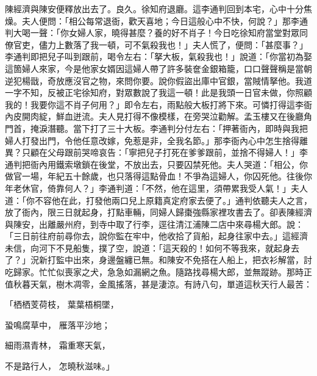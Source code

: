\begin{showcontents}{}
陳經濟與陳安便釋放出去了。良久。徐知府退廳。這李通判回到本宅，心中十分焦燥。夫人便問：「相公每常退衙，歡天喜地；今日這般心中不快，何說？」那李通判大喝一聲：「你女婦人家，曉得甚麼？養的好不肖子！今日吃徐知府當堂對眾同僚官吏，儘力上數落了我一頓，可不氣殺我也！」夫人慌了，便問：「甚麼事？」李通判即把兒子叫到跟前，喝令左右：「拏大板，氣殺我也！」說道：「你當初為娶這箇婦人來家，今是他家女婿因這婦人帶了許多裝奩金銀箱籠，口口聲聲稱是當朝逆犯楊戩，奇放應沒官之物，來問你要。說你假盜出庫中官銀，當賊情拏他。我道一字不知，反被正宅徐知府，對眾數說了我這一頓！此是我頭一日官未做，你照顧我的！我要你這不肖子何用？」即令左右，雨點般大板打將下來。可憐打得這李衙內皮開肉綻，鮮血迸流。夫人見打得不像模樣，在旁哭泣勸解。孟玉樓又在後廳角門首，掩淚潛聽。當下打了三十大板。李通判分付左右：「押著衙內，即時與我把婦人打發出門，令他任意改嫁，免惹是非，全我名節。」那李衙內心中怎生捨得離異？只顧在父母跟前哭啼哀告：「寧把兒子打死在爹爹跟前，並捨不得婦人！」李通判把衙內用鐵索墩鎖在後堂，不放出去，只要囚禁死他。夫人哭道：「相公，你做官一場，年紀五十餘歲，也只落得這點骨血！不爭為這婦人，你囚死他。往後你年老休官，倚靠何人？」李通判道：「不然，他在這里，須帶累我受人氣！」夫人道：「你不容他在此，打發他兩口兒上原籍真定府家去便了。」通判依聽夫人之言，放了衙內，限三日就起身，打點車輛，同婦人歸棗強縣家裡攻書去了。卻表陳經濟與陳安，出離嚴州府，到寺中取了行李，逕往清江浦陳二店中來尋楊大郎。說：「三日前往府前尋你去，說你監在牢中，他收拾了貨船，起身往家中去。」這經濟未信，向河下不見船隻，撲了空，說道：「這天殺的！如何不等我來，就起身去了？」況新打監中出來，身邊盤纏已無。和陳安不免搭在人船上，把衣衫解當，討吃歸家。忙忙似喪家之犬，急急如漏網之魚。隨路找尋楊大郎，並無蹤跡。那時正值秋暮天氣，樹木凋零，金風搖落，甚是淒涼。有詩八句，單道這秋天行人最苦：

「栖栖芰荷枝，  葉葉梧桐墜，

蛩鳴腐草中，  雁落平沙地；

細雨濕青林，  霜重寒天氣，

不是路行人，  怎曉秋滋味。」


\end{showcontents}
